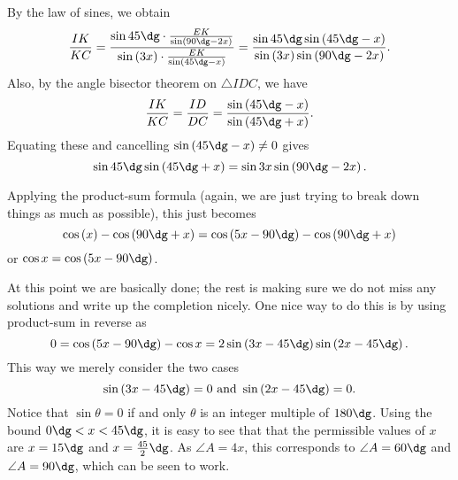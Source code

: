 By the law of sines, we obtain
\[ \frac{IK}{KC} = \frac%
  {\sin 45\dg \cdot \frac{EK}{\sin \left( 90\dg - 2x \right)}}%
  {\sin \left( 3x \right) \cdot \frac{EK}{\sin \left( 45\dg-x \right)}}
  = \frac{\sin 45\dg \sin \left( 45\dg - x \right)}%
  {\sin \left( 3x \right) \sin \left( 90\dg - 2x \right)}. \]
Also, by the angle bisector theorem on $\triangle IDC$,
we have
\[ \frac{IK}{KC} = \frac{ID}{DC}
  = \frac{\sin \left( 45\dg-x \right)}{\sin\left( 45\dg+x \right)}. \]
Equating these and cancelling $\sin \left( 45\dg-x \right) \neq 0$ gives
\[ \sin 45\dg \sin \left( 45\dg + x \right)
  = \sin 3x \sin \left( 90\dg - 2x \right). \]

Applying the product-sum formula
(again, we are just trying to break down things as much as possible),
this just becomes
\[ \cos\left( x \right) - \cos \left( 90\dg + x \right)
  = \cos \left( 5x-90\dg \right) - \cos \left( 90\dg+x \right) \]
or $\cos x = \cos \left( 5x-90\dg \right)$.

At this point we are basically done;
the rest is making sure we do not miss any solutions
and write up the completion nicely.
One nice way to do this is by using product-sum in reverse as
\[ 0 = \cos \left( 5x-90\dg \right) - \cos x
  = 2 \sin \left( 3x - 45\dg \right) \sin \left( 2x-45\dg \right). \]
This way we merely consider the two cases
\[ \sin \left( 3x-45\dg \right) = 0 \text{ and }
  \sin \left( 2x - 45\dg \right) = 0. \]
Notice that $\sin\theta = 0$ if and only $\theta$
is an integer multiple of $180\dg$.
Using the bound $0\dg < x < 45\dg$,
it is easy to see that that the permissible values of $x$
are $x = 15\dg$ and $x = \frac{45}{2}\dg$.
As $\angle A = 4x$, this corresponds to $\angle A = 60\dg$
and $\angle A = 90\dg$, which can be seen to work.
